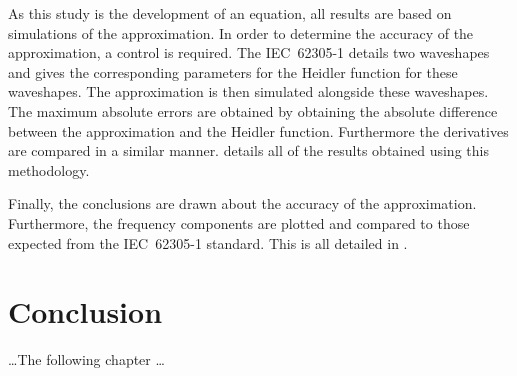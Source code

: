 As this study is the development of an equation, all results are based on simulations of the approximation. In order to determine the accuracy of the approximation, a control is required. The IEC~62305-1 details two waveshapes and gives the corresponding parameters for the Heidler function for these waveshapes. The approximation is then simulated alongside these waveshapes. The maximum absolute errors are obtained by obtaining the absolute difference between the approximation and the Heidler function. Furthermore the derivatives are compared in a similar manner.  details all of the results obtained using this methodology.

Finally, the conclusions are drawn about the accuracy of the approximation. Furthermore, the frequency components are plotted and compared to those expected from the IEC~62305-1 standard. This is all detailed in .


\section{Conclusion}
\label{sec:approach_conclusion}
\ldots The following chapter \ldots

